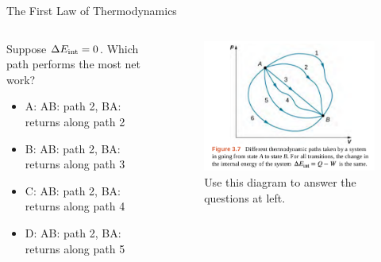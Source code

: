 \documentclass{beamer}
\begin{document}
\begin{frame}{The First Law of Thermodynamics}
\begin{columns}[T]
\begin{column}{0.5\textwidth}
\small Suppose $\Delta E_{\rm int} = 0$.  Which path performs the most net work?
\begin{itemize}
\item A: AB: path 2, BA: returns along path 2
\item B: AB: path 2, BA: returns along path 3
\item C: AB: path 2, BA: returns along path 4
\item D: AB: path 2, BA: returns along path 5
\end{itemize}
\end{column}
\begin{column}{0.5\textwidth}
\begin{figure}
\centering
\includegraphics[width=\textwidth]{figures/states1.png}
\caption{\label{fig:states3} Use this diagram to answer the questions at left.}
\end{figure}
\end{column}
\end{columns}
\end{frame}
\end{document}
